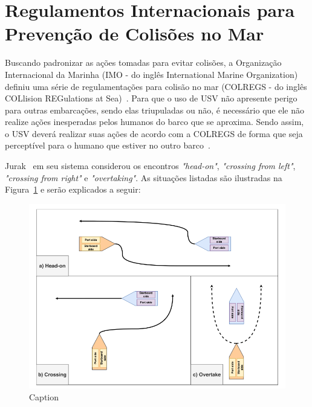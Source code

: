         
    
    \section{Regulamentos Internacionais para Prevenção de Colisões no Mar}\label{subchap2:colregs}
        Buscando padronizar as ações tomadas para evitar colisões, a Organização Internacional da Marinha (IMO - do inglês International Marine Organization) definiu uma série de regulamentações para colisão no mar (COLREGS - do inglês COLlision REGulations at Sea)~\cite{JURAK2020}.
        Para que o uso de USV não apresente perigo para outras embarcações, sendo elas triupuladas ou não, é necessário que ele não realize ações inesperadas pelos humanos do barco que se aproxima. Sendo assim, o USV deverá realizar suas ações de acordo com a COLREGS de forma que seja perceptível para o humano que estiver no outro barco~\cite{KUWATA2014110}.
        
        Jurak~\cite{JURAK2020} em seu sistema considerou os encontros \textit{"head-on"}, \textit{"crossing from left"}, \textit{"crossing from right"} e \textit{"overtaking"}. As situações listadas são ilustradas na Figura~\ref{fig:colregs_situations} e serão explicados a seguir: 
        
        \begin{figure}
            \centering
            \includegraphics[width=\textwidth]{fig/colregs_situations.png}
            \caption{Caption}
            \label{fig:colregs_situations}
        \end{figure}
        
